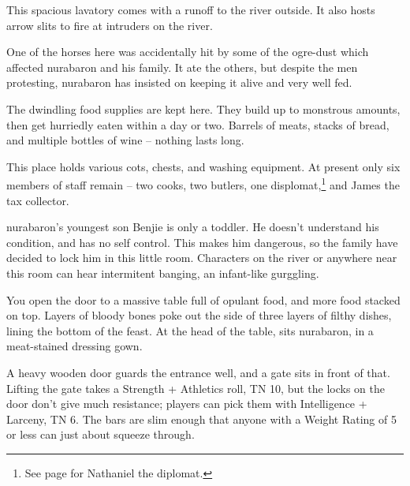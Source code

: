 
This spacious lavatory comes with a runoff to the river outside.  It also hosts arrow slits to fire at intruders on the river.


One of the horses here was accidentally hit by some of the ogre-dust which affected \gls{nurabaron} and his family.  It ate the others, but despite the men protesting, \gls{nurabaron} has insisted on keeping it alive and very well fed.


\nurahorse


The dwindling food supplies are kept here.  They build up to monstrous amounts, then get hurriedly eaten within a day or two.  Barrels of meats, stacks of bread, and multiple bottles of wine -- nothing lasts long.


This place holds various cots, chests, and washing equipment.  At present only six members of staff remain -- two cooks, two butlers, one displomat,\footnote{See page \pageref{nathaniel} for Nathaniel the diplomat.} and James the tax collector.


\Gls{nurabaron}'s youngest son Benjie is only a toddler.  He doesn't understand his condition, and has no self control.  This makes him dangerous, so the family have decided to lock him in this little room.  Characters on the river or anywhere near this room can hear intermitent banging, an infant-like gurggling.


\deephobgoblin


\begin{boxtext}

	You open the door to a massive table full of opulant food, and more food stacked on top.  Layers of bloody bones poke out the side of three layers of filthy dishes, lining the bottom of the feast.  At the head of the table, sits \gls{nurabaron}, in a meat-stained dressing gown.

\end{boxtext}

A heavy wooden door guards the entrance well, and a gate sits in front of that.  Lifting the gate takes a Strength + Athletics roll, TN 10, but the locks on the door don't give much resistance; players can pick them with Intelligence + Larceny, TN 6.  The bars are slim enough that anyone with a Weight Rating of 5 or less can just about squeeze through.

